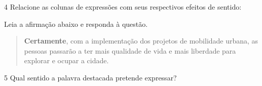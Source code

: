
\num{4} Relacione as colunas de expressões com seus respectivos efeitos de sentido:






Leia a afirmação abaixo e responda à questão.

\begin{quote}

\textbf{Certamente}, com a implementação dos projetos de mobilidade
urbana, as pessoas passarão a ter mais qualidade de vida e mais
liberdade para explorar e ocupar a cidade.

\end{quote}

\num{5} Qual sentido a palavra destacada pretende expressar?



